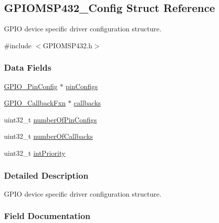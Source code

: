 \subsection{G\+P\+I\+O\+M\+S\+P432\+\_\+\+Config Struct Reference}
\label{struct_g_p_i_o_m_s_p432___config}


G\+P\+I\+O device specific driver configuration structure.  




{\ttfamily \#include $<$G\+P\+I\+O\+M\+S\+P432.\+h$>$}

\subsubsection*{Data Fields}
\begin{DoxyCompactItemize}
\item 
\hyperlink{_g_p_i_o_8h_a7f5d979226db633309b3fdc0f4a8aef6}{G\+P\+I\+O\+\_\+\+Pin\+Config} $\ast$ \hyperlink{struct_g_p_i_o_m_s_p432___config_ad61e701f1cb3830a20815378bfeb3f9e}{pin\+Configs}
\item 
\hyperlink{_g_p_i_o_8h_a033bc79f1a530381da2b74711e6b8971}{G\+P\+I\+O\+\_\+\+Callback\+Fxn} $\ast$ \hyperlink{struct_g_p_i_o_m_s_p432___config_afbe064dac3400a1a2611af3ed82a7861}{callbacks}
\item 
uint32\+\_\+t \hyperlink{struct_g_p_i_o_m_s_p432___config_a54ddb71ce4159e6ac861d2b55145da3f}{number\+Of\+Pin\+Configs}
\item 
uint32\+\_\+t \hyperlink{struct_g_p_i_o_m_s_p432___config_adf1fcd7f8dc5c1b82699519f46ebe85d}{number\+Of\+Callbacks}
\item 
uint32\+\_\+t \hyperlink{struct_g_p_i_o_m_s_p432___config_a6cfc0b5cac2a793b7c2ff64b05ff0994}{int\+Priority}
\end{DoxyCompactItemize}


\subsubsection{Detailed Description}
G\+P\+I\+O device specific driver configuration structure. 

\subsubsection{Field Documentation}
